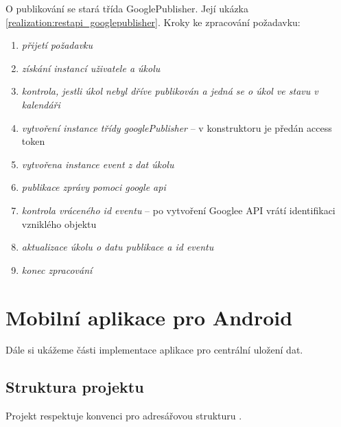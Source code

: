 \documentclass[thesis=B,czech]{FITthesis}[2012/06/26]
\begin{document}
O publikování se stará třída GooglePublisher. Její ukázka \ref{realization:restapi_googlepublisher}.
\vspace*{1\baselineskip}
\newline
Kroky ke zpracování požadavku:
\begin{enumerate}[nosep]
	\item \textit{přijetí požadavku}
	\item \textit{získání instancí uživatele a úkolu} 
	\item \textit{kontrola, jestli úkol nebyl dříve publikován a jedná se o úkol ve stavu v kalendáři}
	\item \textit{vytvoření instance třídy googlePublisher} -- v konstruktoru je předán access token
	\item \textit{vytvořena instance event z dat úkolu} 
	\item \textit{publikace zprávy pomoci google api} 
	\item \textit{kontrola vráceného id eventu} -- po vytvoření Googlee API vrátí identifikaci vzniklého objektu
	\item \textit{aktualizace úkolu o datu publikace a id eventu}
	\item \textit{konec zpracování}
\end{enumerate}





\section{Mobilní aplikace pro Android}

Dále si ukážeme části implementace aplikace pro centrální uložení dat.

\subsection{Struktura projektu}

Projekt respektuje konvenci pro adresářovou strukturu \cite{realization_androi_project_structure}.

\begin{figure}[h!]
\end{figure}
\end{document}
